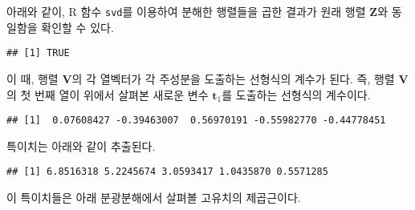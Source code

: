 \documentclass[
]{book}
\newenvironment{Shaded}{\begin{snugshade}}{\end{snugshade}}
\newcommand{\DecValTok}[1]{\textcolor[rgb]{0.00,0.00,0.81}{#1}}
\newcommand{\FunctionTok}[1]{\textcolor[rgb]{0.00,0.00,0.00}{#1}}
\newcommand{\NormalTok}[1]{#1}
\newcommand{\OtherTok}[1]{\textcolor[rgb]{0.56,0.35,0.01}{#1}}
\newcommand{\SpecialCharTok}[1]{\textcolor[rgb]{0.00,0.00,0.00}{#1}}
\begin{document}
아래와 같이, R 함수 \texttt{svd}를 이용하여 분해한 행렬들을 곱한 결과가 원래 행렬 \(\mathbf{Z}\)와 동일함을 확인할 수 있다.

\begin{Shaded}
\end{Shaded}

\begin{verbatim}
## [1] TRUE
\end{verbatim}

이 때, 행렬 \(\mathbf{V}\)의 각 열벡터가 각 주성분을 도출하는 선형식의 계수가 된다. 즉, 행렬 \(\mathbf{V}\)의 첫 번째 열이 위에서 살펴본 새로운 변수 \(\mathbf{t}_1\)를 도출하는 선형식의 계수이다.

\begin{Shaded}
\end{Shaded}

\begin{verbatim}
## [1]  0.07608427 -0.39463007  0.56970191 -0.55982770 -0.44778451
\end{verbatim}

특이치는 아래와 같이 추출된다.

\begin{Shaded}
\end{Shaded}

\begin{verbatim}
## [1] 6.8516318 5.2245674 3.0593417 1.0435870 0.5571285
\end{verbatim}

이 특이치들은 아래 분광분해에서 살펴볼 고유치의 제곱근이다.
\end{document}
